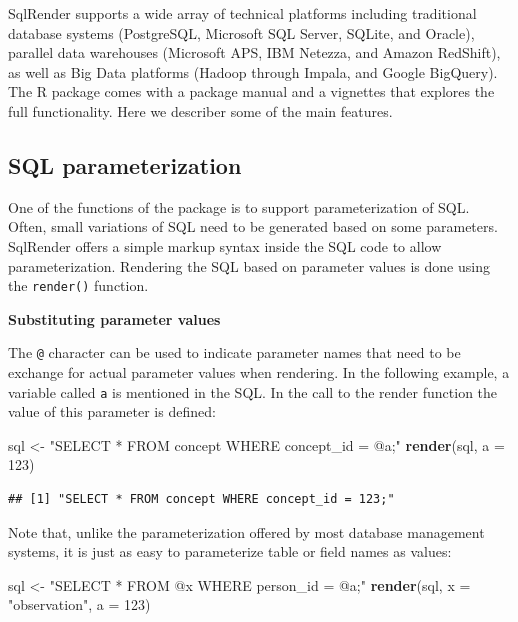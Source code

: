\documentclass[]{book}
\newenvironment{Shaded}{\begin{snugshade}}{\end{snugshade}}
\newcommand{\KeywordTok}[1]{\textcolor[rgb]{0.13,0.29,0.53}{\textbf{#1}}}
\newcommand{\DataTypeTok}[1]{\textcolor[rgb]{0.13,0.29,0.53}{#1}}
\newcommand{\DecValTok}[1]{\textcolor[rgb]{0.00,0.00,0.81}{#1}}
\newcommand{\StringTok}[1]{\textcolor[rgb]{0.31,0.60,0.02}{#1}}
\newcommand{\NormalTok}[1]{#1}
\begin{document}
SqlRender supports a wide array of technical platforms including
traditional database systems (PostgreSQL, Microsoft SQL Server, SQLite,
and Oracle), parallel data warehouses (Microsoft APS, IBM Netezza, and
Amazon RedShift), as well as Big Data platforms (Hadoop through Impala,
and Google BigQuery). The R package comes with a package manual and a
vignettes that explores the full functionality. Here we describer some
of the main features.

\subsection{SQL parameterization}\label{sql-parameterization}

One of the functions of the package is to support parameterization of
SQL. Often, small variations of SQL need to be generated based on some
parameters. SqlRender offers a simple markup syntax inside the SQL code
to allow parameterization. Rendering the SQL based on parameter values
is done using the \texttt{render()} function.

\textbf{Substituting parameter values}

The \texttt{@} character can be used to indicate parameter names that
need to be exchange for actual parameter values when rendering. In the
following example, a variable called \texttt{a} is mentioned in the SQL.
In the call to the render function the value of this parameter is
defined:

\begin{Shaded}
\begin{Highlighting}[]
\NormalTok{sql <-}\StringTok{ "SELECT * FROM concept WHERE concept_id = @a;"}
\KeywordTok{render}\NormalTok{(sql, }\DataTypeTok{a =} \DecValTok{123}\NormalTok{)}
\end{Highlighting}
\end{Shaded}

\begin{verbatim}
## [1] "SELECT * FROM concept WHERE concept_id = 123;"
\end{verbatim}

Note that, unlike the parameterization offered by most database
management systems, it is just as easy to parameterize table or field
names as values:

\begin{Shaded}
\begin{Highlighting}[]
\NormalTok{sql <-}\StringTok{ "SELECT * FROM @x WHERE person_id = @a;"}
\KeywordTok{render}\NormalTok{(sql, }\DataTypeTok{x =} \StringTok{"observation"}\NormalTok{, }\DataTypeTok{a =} \DecValTok{123}\NormalTok{)}
\end{Highlighting}
\end{Shaded}
\end{document}
